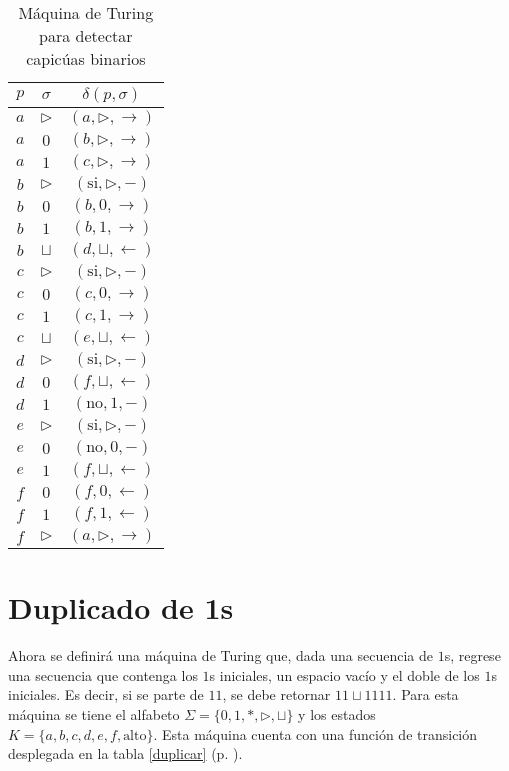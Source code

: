 \documentclass[paper=leter, fontsize=11pt]{scrartcl}
\numberwithin{equation}{section}		%
\numberwithin{figure}{section}			%
\numberwithin{table}{section}				%
\begin{document}
\begin{table}[]
	\caption{Máquina de Turing para detectar capicúas binarios}
	\label{capicua}
	\centering
	\begin{tabular}{cc|c}
	$p$ & $\sigma$ & $\delta(p, \sigma)$ \\ \hline
	$a$ & $\triangleright$ & $(a, \triangleright, \rightarrow)$ \\
	$a$ & $0$ & $(b, \triangleright, \rightarrow)$ \\
	$a$ & $1$ & $(c, \triangleright, \rightarrow)$ \\
	$b$ & $\triangleright$ & $(\text{si}, \triangleright, -)$ \\
	$b$ & $0$ & $(b, 0, \rightarrow)$ \\
	$b$ & $1$ & $(b, 1, \rightarrow)$ \\
	$b$ & $\sqcup$ & $(d, \sqcup, \leftarrow)$ \\
	$c$ & $\triangleright$ & $(\text{si}, \triangleright, -)$ \\
	$c$ & $0$ & $(c, 0, \rightarrow)$ \\
	$c$ & $1$ & $(c, 1, \rightarrow)$ \\
	$c$ & $\sqcup$ & $(e, \sqcup, \leftarrow)$ \\
	$d$ & $\triangleright$ & $(\text{si}, \triangleright, -)$ \\
	$d$ & $0$ & $(f, \sqcup, \leftarrow)$ \\
	$d$ & $1$ & $(\text{no}, 1, -)$ \\
	$e$ & $\triangleright$ & $(\text{si}, \triangleright, -)$ \\
	$e$ & $0$ & $(\text{no}, 0, -)$ \\
	$e$ & $1$ & $(f, \sqcup, \leftarrow)$ \\
	$f$ & $0$ & $(f, 0, \leftarrow)$ \\
	$f$ & $1$ & $(f, 1, \leftarrow)$ \\
	$f$ & $\triangleright$ & $(a, \triangleright, \rightarrow)$
	\end{tabular}
\end{table}


\section{Duplicado de 1s}

Ahora se definirá una máquina de Turing que, dada una secuencia de $1$s, regrese una secuencia que contenga los $1$s iniciales, un espacio vacío y el doble de los $1$s iniciales. Es decir, si se parte de $11$, se debe retornar $11 \sqcup 1111$. Para esta máquina se tiene el alfabeto $\Sigma = \{ 0, 1, *, \triangleright, \sqcup \}$ y los estados $K = \{ a, b, c, d, e, f, \text{alto} \}$. Esta máquina cuenta con una función de transición desplegada en la tabla \ref{duplicar} (p. \pageref{duplicar}).
\end{document}
